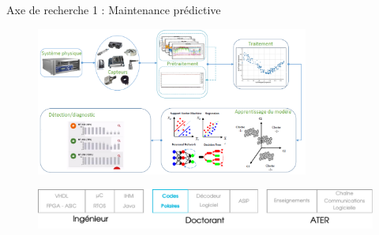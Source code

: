 \documentclass[t,compress,mathserif,12pt,xcolor=dvipsnames]{beamer}
\begin{document}
\begin{frame}[t]{Axe de recherche 1 : Maintenance prédictive}

  \begin{minipage}[t][5.0cm][t]{\textwidth}
    \vspace*{-0.5cm}
    \begin{figure}[htp]
      \centering
      \includegraphics[width=0.8\textwidth]{fig/research/worldcast/phm.pdf}
    \end{figure}
  \end{minipage}
  \begin{figure}[htp]
    \centering
    \includegraphics[width=\textwidth]{fig/frise20}
  \end{figure}
\end{frame}
\end{document}
